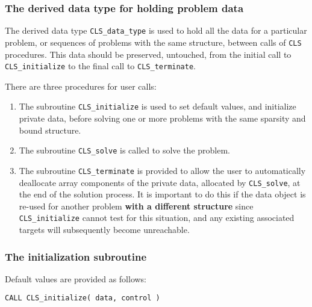 \documentclass{galahad}
\newcommand{\packagename}{CLS}
\begin{document}
\subsubsection{The derived data type for holding problem data}\label{typedata}
The derived data type
{\tt \packagename\_data\_type}
is used to hold all the data for a particular problem,
or sequences of problems with the same structure, between calls of
{\tt \packagename} procedures.
This data should be preserved, untouched, from the initial call to
{\tt \packagename\_initialize}
to the final call to
{\tt \packagename\_terminate}.


\galarguments
There are three procedures for user calls:

\begin{enumerate}
\item The subroutine
      {\tt \packagename\_initialize}
      is used to set default values, and initialize private data,
      before solving one or more problems with the
      same sparsity and bound structure.
\item The subroutine
      {\tt \packagename\_solve}
      is called to solve the problem.
\item The subroutine
      {\tt \packagename\_terminate}
      is provided to allow the user to automatically deallocate array
       components of the private data, allocated by
       {\tt \packagename\_solve},
       at the end of the solution process.
       It is important to do this if the data object is re-used for another
       problem {\bf with a different structure}
       since {\tt \packagename\_initialize} cannot test for this situation,
       and any existing associated targets will subsequently become unreachable.
\end{enumerate}


\subsubsection{The initialization subroutine}\label{subinit}
 Default values are provided as follows:
\vspace*{1mm}

\hspace{8mm}
{\tt CALL \packagename\_initialize( data, control )}
\end{document}
